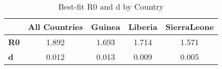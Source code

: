 \begin{table}[hbt]
\caption{Best-fit R0 and d by Country}
\centering
\begin{tabular}{l c c c c}
\toprule 
     \ & All Countries & Guinea & Liberia & SierraLeone\\ 
\midrule 
    \textbf{R0} & 1.892 & 1.693 & 1.714 & 1.571 \\ 
    \textbf{d} & 0.012 & 0.013 & 0.009 & 0.005 \\ 
\bottomrule 
\end{tabular}
\end{table}
